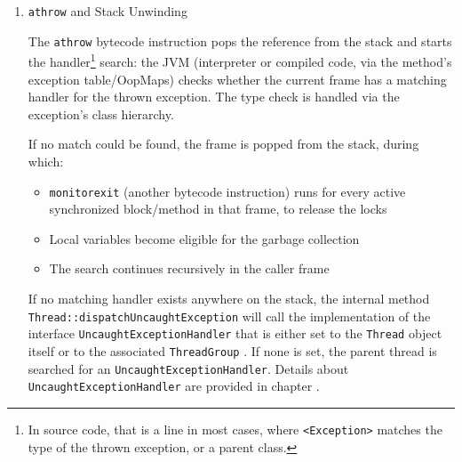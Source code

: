 \begin{enumerate}
	\item{\lstinline|athrow| and Stack Unwinding 
	
	The \lstinline|athrow| bytecode instruction pops the reference from the stack and starts the handler\footnote{In source code, that  is a  line in most cases, where \texttt{<Exception>} matches the type of the thrown exception, or a parent class.} search: the JVM (interpreter or compiled code, via the method's exception table/OopMaps) checks whether the current frame has a matching handler for the thrown exception. The type check is handled via the exception’s class hierarchy.
	
	If no match could be found, the frame is popped from the stack, during which:
	\begin{itemize}
		\item{\lstinline|monitorexit| (another bytecode instruction) runs for every active synchronized block/method in that frame, to release the locks}
		\item{Local variables become eligible for the garbage collection}
		\item{The search continues recursively in the caller frame}
	\end{itemize}
	If no matching handler exists anywhere on the stack, the internal method \lstinline|Thread::dispatchUncaughtException| will call the implementation of the interface \lstinline|UncaughtExceptionHandler| \autocite{ORACLE_DOC_UNCAUGHTEXCEPTIONHANDLER_INTERFACE} that is either set to the \lstinline|Thread| \autocite{ORACLE_DOC_THREAD_CLASS} object itself or to the associated \lstinline|ThreadGroup| \autocite{ORACLE_DOC_THREADGROUP_CLASS}. If none is set, the parent thread is searched for an \lstinline|UncaughtExceptionHandler|.
	Details about \lstinline|UncaughtExceptionHandler| are provided in chapter .}
\end{enumerate}



